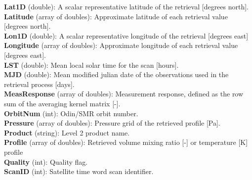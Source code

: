 \textbf{Lat1D} (double): A scalar representative latitude of the retrieval [degrees north]. \\ %

\textbf{Latitude} (array of doubles): Approximate latitude of each retrieval value [degrees north]. \\

\textbf{Lon1D} (double): A scalar representative longitude of the retrieval [degrees east] \\ %

\textbf{Longitude} (array of doubles): Approximate longitude of each retrieval value [degrees east]. \\

\textbf{LST} (double): Mean local solar time for the scan [hours]. \\ %

\textbf{MJD} (double): Mean modified julian date of the observations used in the retrieval process [days]. \\

\textbf{MeasResponse} (array of doubles): Measurement response, defined as the row sum of the averaging kernel matrix [-]. \\ %

\textbf{OrbitNum} (int): Odin/SMR orbit number. \\ %

\textbf{Pressure} (array of doubles): Pressure grid of the retrieved profile [Pa]. \\

\textbf{Product} (string): Level 2 product name. \\

\textbf{Profile} (array of doubles): Retrieved volume mixing ratio [-] or temperature [K] profile  \\ %

\textbf{Quality} (int): Quality flag. \\ %

\textbf{ScanID} (int): Satellite time word scan identifier. \\

